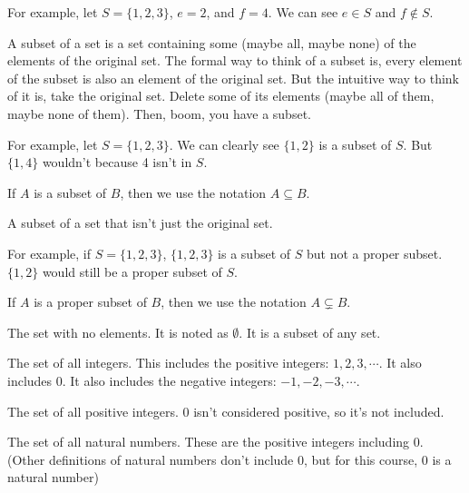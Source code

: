 \documentclass[11pt]{scrartcl}
\begin{document}
For example, let $S = \{1, 2, 3\}$, $e = 2$, and $f = 4$. We can see $e \in S$ and $f \notin S$.

\begin{definition}[Subset]
    A subset of a set is a set containing some (maybe all, maybe none) of the elements of the original set. The formal way to think of a subset is, every element of the subset is also an element of the original set. But the intuitive way to think of it is, take the original set. Delete some of its elements (maybe all of them, maybe none of them). Then, boom, you have a subset.
\end{definition}
    For example, let $S = \{1, 2, 3\}$. We can clearly see $\{1, 2\}$ is a subset of $S$. But $\{1, 4\}$ wouldn't because 4 isn't in $S$.

If $A$ is a subset of $B$, then we use the notation $A \subseteq B$.

\begin{definition}
    A subset of a set that isn't just the original set.
\end{definition}
For example, if $S = \{1, 2, 3\}$, $\{1, 2, 3\}$ is a subset of $S$ but not a proper subset. $\{1, 2\}$ would still be a proper subset of $S$.

If $A$ is a proper subset of $B$, then we use the notation $A \subsetneq B$.

\begin{definition}
The set with no elements. It is noted as $\emptyset$. It is a subset of any set.
\end{definition}

\begin{definition}[$\mathbb{Z}$]
The set of all integers. This includes the positive integers: $1, 2, 3, \cdots$. It also includes $0$. It also includes the negative integers: $-1, -2, -3, \cdots$.
\end{definition}

\begin{definition}[$\mathbb{Z^+}$]
The set of all positive integers. $0$ isn't considered positive, so it's not included.
\end{definition}

\begin{definition}[$\mathbb{N}$]
The set of all natural numbers. These are the positive integers including 0. (Other definitions of natural numbers don't include 0, but for this course, 0 is a natural number)
\end{definition}
\end{document}
